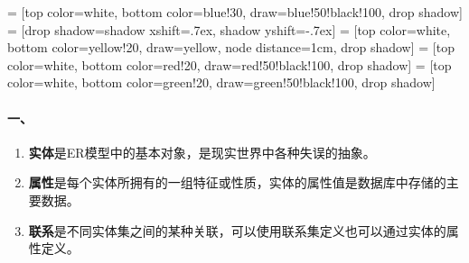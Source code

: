 \documentclass[10pt,a4paper]{article}
\begin{document}
	\pagestyle{main}    %
	\usetikzlibrary{positioning}
	\usetikzlibrary{shadows}
	\usetikzlibrary{arrows}
	 = [top color=white, bottom color=blue!30, 
                            draw=blue!50!black!100, drop shadow]
	 = [drop shadow={shadow xshift=.7ex, 
                                 shadow yshift=-.7ex}]
	 = [top color=white, bottom color=yellow!20, 
                               draw=yellow, node distance=1cm, drop shadow]
	 = [top color=white, bottom color=red!20, 
                                  draw=red!50!black!100, drop shadow]
	 = [top color=white, bottom color=green!20, 
                         draw=green!50!black!100, drop shadow]

	\setlength{\parskip}{0pt}
	\renewcommand{\baselinestretch}{1.5}
	
	\paragraph{一、}
	\begin{enumerate}
		\item \textbf{实体}是ER模型中的基本对象，是现实世界中各种失误的抽象。
		\item \textbf{属性}是每个实体所拥有的一组特征或性质，实体的属性值是数据库中存储的主要数据。
		\item \textbf{联系}是不同实体集之间的某种关联，可以使用联系集定义也可以通过实体的属性定义。
	\end{enumerate}
\end{document}

